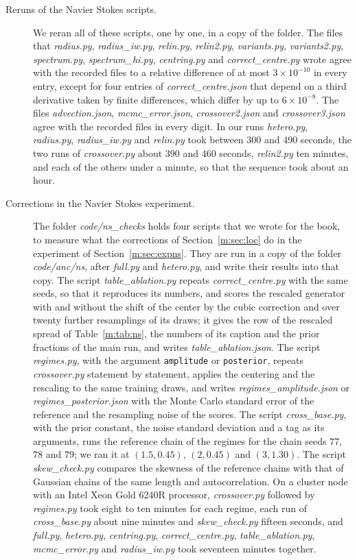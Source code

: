 \begin{description}
\item[Reruns of the Navier Stokes scripts.] We reran all of these scripts, one by one, in a copy of the folder. The files that \textit{radius.py}, \textit{radius\_iw.py}, \textit{relin.py}, \textit{relin2.py}, \textit{variants.py}, \textit{variants2.py}, \textit{spectrum.py}, \textit{spectrum\_hi.py}, \textit{centring.py} and \textit{correct\_centre.py} wrote agree with the recorded files to a relative difference of at most $3\times10^{-10}$ in every entry, except for four entries of \textit{correct\_centre.json} that depend on a third derivative taken by finite differences, which differ by up to $6\times10^{-8}$. The files \textit{advection.json}, \textit{mcmc\_error.json}, \textit{crossover2.json} and \textit{crossover3.json} agree with the recorded files in every digit. In our runs \textit{hetero.py}, \textit{radius.py}, \textit{radius\_iw.py} and \textit{relin.py} took between 300 and 490 seconds, the two runs of \textit{crossover.py} about 390 and 460 seconds, \textit{relin2.py} ten minutes, and each of the others under a minute, so that the sequence took about an hour.
\item[Corrections in the Navier Stokes experiment.] The folder \textit{code/ns\_checks} holds four scripts that we wrote for the book, to measure what the corrections of Section~\ref{m:sec:loc} do in the experiment of Section~\ref{m:sec:expns}. They are run in a copy of the folder \textit{code/anc/ns}, after \textit{full.py} and \textit{hetero.py}, and write their results into that copy. The script \textit{table\_ablation.py} repeats \textit{correct\_centre.py} with the same seeds, so that it reproduces its numbers, and scores the rescaled generator with and without the shift of the center by the cubic correction and over twenty further resamplings of its draws; it gives the row of the rescaled spread of Table~\ref{m:tab:ns}, the numbers of its caption and the prior fractions of the main run, and writes \textit{table\_ablation.json}. The script \textit{regimes.py}, with the argument \texttt{amplitude} or \texttt{posterior}, repeats \textit{crossover.py} statement by statement, applies the centering and the rescaling to the same training draws, and writes \textit{regimes\_amplitude.json} or \textit{regimes\_posterior.json} with the Monte Carlo standard error of the reference and the resampling noise of the scores. The script \textit{cross\_base.py}, with the prior constant, the noise standard deviation and a tag as its arguments, runs the reference chain of the regimes for the chain seeds $77$, $78$ and $79$; we ran it at $(1.5, 0.45)$, $(2, 0.45)$ and $(3, 1.30)$. The script \textit{skew\_check.py} compares the skewness of the reference chains with that of Gaussian chains of the same length and autocorrelation. On a cluster node with an Intel Xeon Gold 6240R processor, \textit{crossover.py} followed by \textit{regimes.py} took eight to ten minutes for each regime, each run of \textit{cross\_base.py} about nine minutes and \textit{skew\_check.py} fifteen seconds, and \textit{full.py}, \textit{hetero.py}, \textit{centring.py}, \textit{correct\_centre.py}, \textit{table\_ablation.py}, \textit{mcmc\_error.py} and \textit{radius\_iw.py} took seventeen minutes together.

\end{description}
